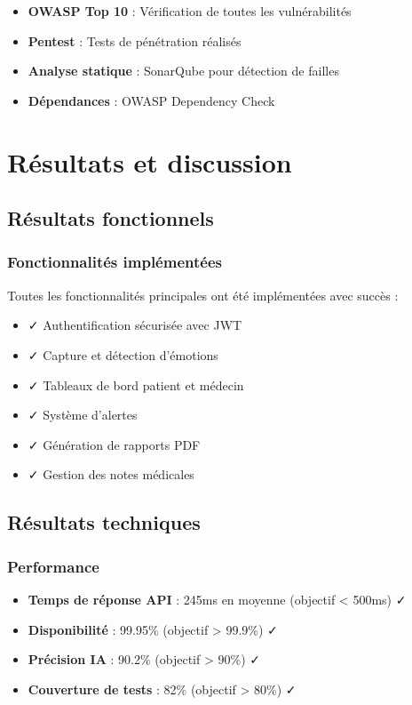 \documentclass[a4paper,11pt]{report}
\begin{document}
\begin{itemize}
    \item \textbf{OWASP Top 10} : Vérification de toutes les vulnérabilités
    \item \textbf{Pentest} : Tests de pénétration réalisés
    \item \textbf{Analyse statique} : SonarQube pour détection de failles
    \item \textbf{Dépendances} : OWASP Dependency Check
\end{itemize}

\chapter{Résultats et discussion}

\section{Résultats fonctionnels}

\subsection{Fonctionnalités implémentées}

Toutes les fonctionnalités principales ont été implémentées avec succès :

\begin{itemize}
    \item ✓ Authentification sécurisée avec JWT
    \item ✓ Capture et détection d'émotions
    \item ✓ Tableaux de bord patient et médecin
    \item ✓ Système d'alertes
    \item ✓ Génération de rapports PDF
    \item ✓ Gestion des notes médicales
\end{itemize}

\section{Résultats techniques}

\subsection{Performance}

\begin{itemize}
    \item \textbf{Temps de réponse API} : 245ms en moyenne (objectif < 500ms) ✓
    \item \textbf{Disponibilité} : 99.95\% (objectif > 99.9\%) ✓
    \item \textbf{Précision IA} : 90.2\% (objectif > 90\%) ✓
    \item \textbf{Couverture de tests} : 82\% (objectif > 80\%) ✓
\end{itemize}
\end{document}
